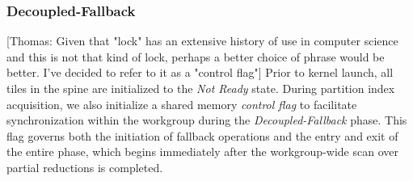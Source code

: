 \documentclass[sigconf]{acmart}
\newcommand{\thomas}[1]{{\footnotesize\color{orange}[Thomas: #1]}}
\begin{document}
\subsubsection{Decoupled-Fallback}
\thomas{Given that "lock" has an extensive history of use in computer science and this is not that kind of lock, perhaps a better choice of phrase would be better. I've decided to refer to it as a "control flag"}
Prior to kernel launch, all tiles in the spine are initialized to the \emph{Not Ready} state. During partition index acquisition, we also initialize a shared memory \emph{control flag} to facilitate synchronization within the workgroup during the \emph{Decoupled-Fallback} phase. This flag governs both the initiation of fallback operations and the entry and exit of the entire phase, which begins immediately after the workgroup-wide scan over partial reductions is completed.
\end{document}
